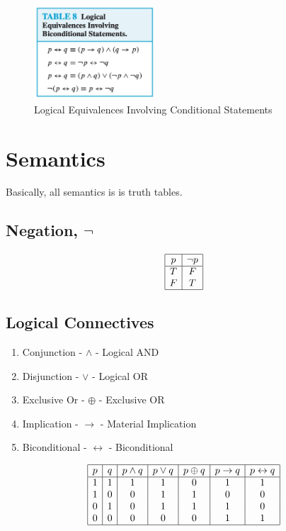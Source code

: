 \documentclass[12pt]{article}
\begin{document}
\begin{figure}[H]
    \centering
    \includegraphics[width=0.4\textwidth]{"./Logical Equivalences Involving Biconditional Statements.jpg"}
    \caption{Logical Equivalences Involving Conditional Statements}
    \label{fig:logical_equivalences_conditional}
\end{figure}

\section{Semantics}

Basically, all semantics is is truth tables.

\subsection{Negation, $\neg$}

\[
\begin{array}{|c|c|}
\hline
p & \neg p \\
\hline
T & F \\
F & T \\
\hline
\end{array}
\]

\subsection{Logical Connectives}

\begin{enumerate}
  \item Conjunction - $\land$ - Logical AND
  \item Disjunction - $\lor$ - Logical OR
  \item Exclusive Or - $\oplus$ - Exclusive OR
  \item Implication - $\to$ - Material Implication
  \item Biconditional - $\leftrightarrow$ - Biconditional
\end{enumerate}

\[
\begin{array}{|c|c|c|c|c|c|c|}
\hline
p & q & p \land q & p \lor q & p \oplus q & p \to q & p \leftrightarrow q \\
\hline
1 & 1 & 1 & 1 & 0 & 1 & 1 \\
1 & 0 & 0 & 1 & 1 & 0 & 0 \\
0 & 1 & 0 & 1 & 1 & 1 & 0 \\
0 & 0 & 0 & 0 & 0 & 1 & 1 \\
\hline
\end{array}
\]
\end{document}
